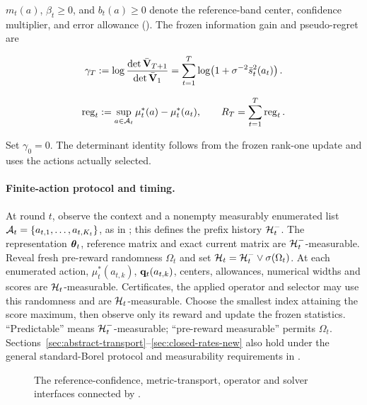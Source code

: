 $m_t(a)$, $\beta_t\ge0$, and $b_t(a)\ge0$ denote the reference-band center,
confidence multiplier, and error allowance ().
The frozen information gain and pseudo-regret are

\begin{equation}\label{eq:frozen-gamma-new}
 \gamma_T
 :=\log\frac{\det\bar{\mathbf{V}}_{T+1}}{\det\bar{\mathbf{V}}_1}
 =\sum_{t=1}^T\log\!\left(1+\sigma^{-2}\bar s_t^2(a_t)\right).
\end{equation}

\begin{equation}\label{eq:regret-definition-new}
 \operatorname{reg}_t
 :=\sup_{a\in\mathcal{A}_t}\mu_t^*(a)-\mu_t^*(a_t),
 \qquad R_T=\sum_{t=1}^T\operatorname{reg}_t.
\end{equation}

Set $\gamma_0=0$. The determinant identity follows from the frozen rank-one
update and uses the actions actually selected.

\paragraph{Finite-action protocol and timing.}
At round $t$, observe the context and a nonempty measurably enumerated list
$\mathcal{A}_t=\{a_{t,1},\ldots,a_{t,K_t}\}$, as in
; this defines the prefix history
$\mathcal{H}_t^-$. The representation $\boldsymbol{\theta}_t$, reference matrix and exact
current matrix are $\mathcal{H}_t^-$-measurable. Reveal fresh pre-reward randomness
$\Omega_t$ and set $\mathcal{H}_t=\mathcal{H}_t^-\vee\sigma(\Omega_t)$.
At each enumerated action, $\mu_t^*(a_{t,k})$, $\mathbf{q}_t(a_{t,k})$, centers,
allowances, numerical widths and scores are $\mathcal{H}_t$-measurable. Certificates,
the applied operator and selector may use this randomness and are
$\mathcal{H}_t$-measurable. Choose the
smallest index attaining the score maximum, then observe only its reward and
update the frozen statistics. ``Predictable'' means
$\mathcal{H}_t^-$-measurable; ``pre-reward measurable'' permits $\Omega_t$.
Sections~\ref{sec:abstract-transport}--\ref{sec:closed-rates-new} also hold
under the general standard-Borel protocol and measurability requirements in
.

\begin{figure}[t]
 \centering
 
 \caption{The reference-confidence, metric-transport, operator and solver
 interfaces connected by .}
 \label{fig:transport-interfaces}
\end{figure}


